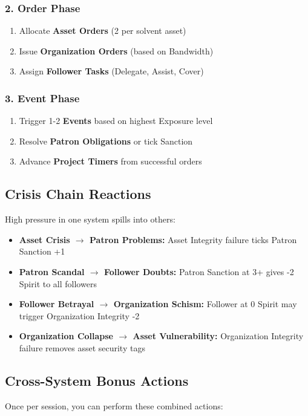 \documentclass[10pt]{article}
\begin{document}
    \subsubsection{2. Order Phase}
    \begin{enumerate}
    \item Allocate \textbf{Asset Orders} (2 per solvent asset)
    \item Issue \textbf{Organization Orders} (based on Bandwidth)
    \item Assign \textbf{Follower Tasks} (Delegate, Assist, Cover)
    \end{enumerate}
    
    \subsubsection{3. Event Phase}
    \begin{enumerate}
    \item Trigger 1-2 \textbf{Events} based on highest Exposure level
    \item Resolve \textbf{Patron Obligations} or tick Sanction
    \item Advance \textbf{Project Timers} from successful orders
    \end{enumerate}
    
    \subsection{Crisis Chain Reactions}
    High pressure in one system spills into others:
    
    \begin{itemize}
    \item \textbf{Asset Crisis $\rightarrow$ Patron Problems:} Asset Integrity failure ticks Patron Sanction +1
    \item \textbf{Patron Scandal $\rightarrow$ Follower Doubts:} Patron Sanction at 3+ gives -2 Spirit to all followers
    \item \textbf{Follower Betrayal $\rightarrow$ Organization Schism:} Follower at 0 Spirit may trigger Organization Integrity -2
    \item \textbf{Organization Collapse $\rightarrow$ Asset Vulnerability:} Organization Integrity failure removes asset security tags
    \end{itemize}
    
    \subsection{Cross-System Bonus Actions}
    Once per session, you can perform these combined actions:
    
\end{document}
